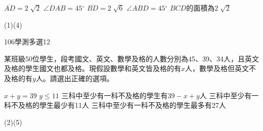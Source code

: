 \begin{QUESTIONS}
\begin{QUESTION}
\begin{QBODY}
			\begin{QOPS}
			\QOP $\overline{AD}=2\sqrt[{}]{2}$
			\QOP $\angle DAB=45{}^\circ $
			\QOP $\overline{BD}=2\sqrt[{}]{6}$
			\QOP $\angle ABD=45{}^\circ $
			\QOP $BCD$的面積為$2\sqrt[{}]{2}$
			\end{QOPS}
        \end{QBODY}
        \begin{QFROMS}
        \end{QFROMS}
        \begin{QTAGS}\end{QTAGS}
        \begin{QANS}
            (1)(4)
        \end{QANS}
        \begin{QSOLLIST}
        \end{QSOLLIST}
        \begin{QEMPTYSPACE}
        \end{QEMPTYSPACE}
    \end{QUESTION}
    \begin{QUESTION}
        \begin{ExamInfo}{106}{學測}{多選}{12}
        \end{ExamInfo}
        \begin{ExamAnsRateInfo}{28}{37}{27}{20}
        \end{ExamAnsRateInfo}
        \begin{QBODY}
			某班級50位學生，段考國文、英文、數學及格的人數分別為45、39、34人，且英文及格的學生國文也都及格。現假設數學和英文皆及格的有$x$人，數學及格但英文不及格的有$y$人。請選出正確的選項。
			\begin{QOPS}
				\QOP $x+y=39$
				\QOP $y\le 11$
				\QOP 三科中至少有一科不及格的學生有$39-x+y$人
				\QOP 三科中至少有一科不及格的學生最少有11人
				\QOP 三科中至少有一科不及格的學生最多有27人
			\end{QOPS}
        \end{QBODY}
        \begin{QFROMS}
        \end{QFROMS}
        \begin{QTAGS}\end{QTAGS}
        \begin{QANS}
            (2)(5)
        \end{QANS}

\end{QUESTION}
\end{QUESTIONS}
